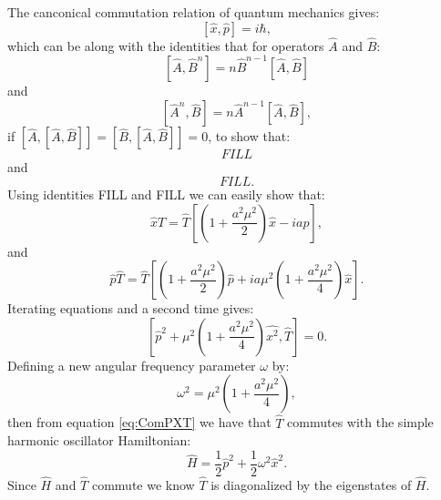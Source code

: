 \documentclass[12pt]{article}
\begin{document}
The canconical commutation relation of quantum mechanics gives:
\begin{equation}
	\label{eq:QMCCM}
	\left[\hat{x},\hat{p}\right] = i\hbar,
\end{equation}
which can be  along with the identities that for operators $\hat{A}$ and $\hat{B}$:
\begin{equation}
	\label{eq:ComutationNIdentity1}
	\left[\hat{A},\hat{B}^n\right] = n\hat{B}^{n-1}\left[\hat{A},\hat{B}\right]
\end{equation}
and
\begin{equation}
	\label{eq:ComutationNIdentity2}
	\left[\hat{A}^n,\hat{B}\right] = n\hat{A}^{n-1}\left[\hat{A},\hat{B}\right],
\end{equation}
if $\left[\hat{A},\left[\hat{A},\hat{B}\right]\right] = \left[\hat{B},\left[\hat{A},\hat{B}\right]\right] = 0 $, to show that:
\begin{equation}
	FILL
\end{equation}
and
\begin{equation}
	FILL.
\end{equation}
Using identities FILL and FILL we can easily show that:
\begin{equation}
	\label{eq:XT}
	\hat{x}\hat{T} = \hat{T}\left[\left(1+\frac{a^2\mu^2}{2}\right)\hat{x} - ia\hat{p}\right],
\end{equation}
and
\begin{equation}
	\label{eq:PT}
	\hat{p}\hat{T} = \hat{T}\left[\left(1+\frac{a^2\mu^2}{2}\right)\hat{p}+ia\mu^2\left(1+\frac{a^2\mu^2}{4}\right)\hat{x}\right].
\end{equation}
Iterating equations \label{eq:XT} and \label{eq:PT} a second time gives:
\begin{equation}
	\label{eq:ComPXT}
	\left[\hat{p}^2+\mu^2\left(1+\frac{a^2\mu^2}{4}\right)\hat{x^2},\hat{T}\right] = 0.
\end{equation}
Defining a new angular frequency parameter $\omega$ by:
\begin{equation}
	\label{eq:omega}
	\omega^2 = \mu^2\left(1+\frac{a^2\mu^2}{4}\right),
\end{equation}
then from equation \ref{eq:ComPXT} we have that $\hat{T}$ commutes with the simple harmonic oscillator Hamiltonian:
\begin{equation}
	\label{eq:OmegaHamiltonian}
	\hat{H} = \frac{1}{2}\hat{p}^2+\frac{1}{2}\omega^2\hat{x}^2.
\end{equation}
Since $\hat{H}$ and $\hat{T}$ commute we know $\hat{T}$ is diagonalized by the eigenstates of $\hat{H}$. 
\end{document}
